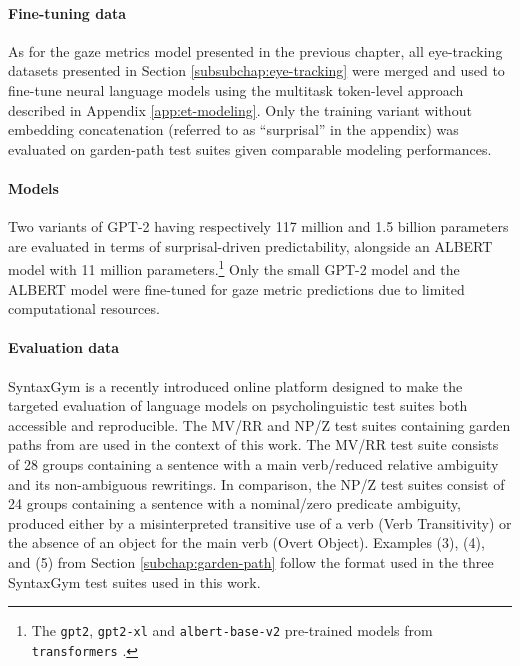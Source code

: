 \documentclass[a4paper, nobind]{templates/ociamthesis}
\begin{document}
\paragraph{Fine-tuning data} As for the gaze metrics model presented in the previous chapter, all eye-tracking datasets presented in Section \ref{subsubchap:eye-tracking} were merged and used to fine-tune neural language models using the multitask token-level approach described in Appendix \ref{app:et-modeling}. Only the training variant without embedding concatenation (referred to as ``surprisal'' in the appendix) was evaluated on garden-path test suites given comparable modeling performances.

\paragraph{Models} Two variants of GPT-2 having respectively 117 million and 1.5 billion parameters are evaluated in terms of surprisal-driven predictability, alongside an ALBERT model with 11 million parameters.\footnote{The \texttt{gpt2}, \texttt{gpt2-xl} and \texttt{albert-base-v2} pre-trained models from 🤗 \texttt{transformers} \autocite{wolf-etal-2020-huggingface}.} Only the small GPT-2 model and the ALBERT model were fine-tuned for gaze metric predictions due to limited computational resources.

\paragraph{Evaluation data} SyntaxGym \autocite{gauthier-etal-2020-syntaxgym} is a recently introduced online platform designed to make the targeted evaluation of language models on psycholinguistic test suites both accessible and reproducible. The MV/RR and NP/Z test suites containing garden paths from \textcite{futrell-etal-2019-neural} are used in the context of this work. The MV/RR test suite consists of 28 groups containing a sentence with a main verb/reduced relative ambiguity and its non-ambiguous rewritings. In comparison, the NP/Z test suites consist of 24 groups containing a sentence with a nominal/zero predicate ambiguity, produced either by a misinterpreted transitive use of a verb (Verb Transitivity) or the absence of an object for the main verb (Overt Object). Examples (3), (4), and (5) from Section \ref{subchap:garden-path} follow the format used in the three SyntaxGym test suites used in this work.
\end{document}
